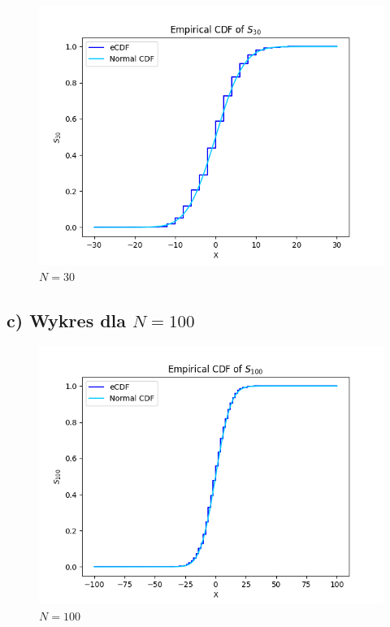 \documentclass{article}
\begin{document}
\begin{figure}[H]
\begin{minipage}{0.24\textwidth}
        \includegraphics[width=\linewidth]{ex2/ex2_30.png}
        \caption{$N=30$}
    \end{minipage}
\end{figure}

\subsection{c) Wykres dla $N=100$}

\begin{figure}[H]
  \centering
        \begin{minipage}{0.49\textwidth}
        \includegraphics[width=\linewidth]{ex2/ex2_100.png}
        \caption{$N=100$}
    \end{minipage}
\end{figure}
\end{document}
